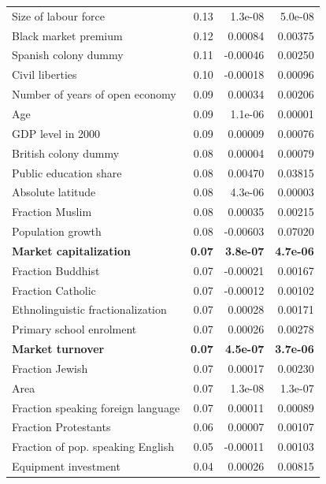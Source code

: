 \begin{table}[!htbp]
\begin{tabular}{lrrr}
		  Size of labour force & 0.13 & 1.3e-08 & 5.0e-08 \\ 
		  Black market premium & 0.12 & 0.00084 & 0.00375 \\ 
		  Spanish colony dummy & 0.11 & -0.00046 & 0.00250 \\ 
		  Civil liberties & 0.10 & -0.00018 & 0.00096 \\ 
		  Number of years of open economy & 0.09 & 0.00034 & 0.00206 \\ 
		  Age & 0.09 & 1.1e-06 & 0.00001 \\ 
		  GDP level in 2000 & 0.09 & 0.00009 & 0.00076 \\ 
		  British colony dummy & 0.08 & 0.00004 & 0.00079 \\ 
		  Public education share & 0.08 & 0.00470 & 0.03815 \\ 
		  Absolute latitude & 0.08 & 4.3e-06 & 0.00003 \\ 
		  Fraction Muslim & 0.08 & 0.00035 & 0.00215 \\ 
		  Population growth & 0.08 & -0.00603 & 0.07020 \\ 
		  \textbf{Market capitalization} & \textbf{0.07} & \textbf{3.8e-07} & \textbf{4.7e-06} \\ 
		  Fraction Buddhist & 0.07 & -0.00021 & 0.00167 \\ 
		  Fraction Catholic & 0.07 & -0.00012 & 0.00102 \\ 
		  Ethnolinguistic fractionalization & 0.07 & 0.00028 & 0.00171 \\ 
		  Primary school enrolment & 0.07 & 0.00026 & 0.00278 \\ 
		  \textbf{Market turnover} & \textbf{0.07} & \textbf{4.5e-07} & \textbf{3.7e-06} \\ 
		  Fraction Jewish & 0.07 & 0.00017 & 0.00230 \\ 
		  Area & 0.07 & 1.3e-08 & 1.3e-07 \\ 
		  Fraction speaking foreign language & 0.07 & 0.00011 & 0.00089 \\ 
		  Fraction Protestants & 0.06 & 0.00007 & 0.00107 \\ 
		  Fraction of pop. speaking English & 0.05 & -0.00011 & 0.00103 \\ 
		  Equipment investment & 0.04 & 0.00026 & 0.00815 \\ 
		\bottomrule
	\end{tabular}
\end{table}

